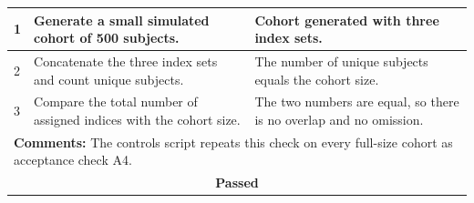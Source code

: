 \begin{table}[H]
\begin{tabular}{|llll|}
\multicolumn{1}{|l|}{1} & \multicolumn{1}{P{5.6cm}|}{Generate a small simulated cohort of 500 subjects.} & \multicolumn{2}{P{6.3cm}|}{Cohort generated with three index sets.} \\ \hline
\multicolumn{1}{|l|}{2} & \multicolumn{1}{P{5.6cm}|}{Concatenate the three index sets and count unique subjects.} & \multicolumn{2}{P{6.3cm}|}{The number of unique subjects equals the cohort size.} \\ \hline
\multicolumn{1}{|l|}{3} & \multicolumn{1}{P{5.6cm}|}{Compare the total number of assigned indices with the cohort size.} & \multicolumn{2}{P{6.3cm}|}{The two numbers are equal, so there is no overlap and no omission.} \\ \hline
\multicolumn{4}{|P{15.2cm}|}{\textbf{Comments:} The controls script repeats this check on every full-size cohort as acceptance check A4.} \\ \hline
\multicolumn{4}{|c|}{\textbf{Passed}} \\ \hline
\end{tabular}
\end{table}

